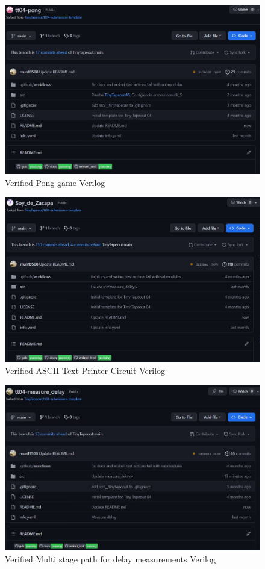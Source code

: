 \begin{figure}[H]
    \centering
    \includegraphics[width=\linewidth]{Pictures/pong.png}
    \caption{Verified Pong game Verilog}\label{fig:pong_verified}
\end{figure}

\begin{figure}[H]
    \centering
    \includegraphics[width=\linewidth]{Pictures/verifide_zacapa.png}
    \caption{Verified ASCII Text Printer Circuit Verilog}\label{fig:ascii_verified}
\end{figure}

\begin{figure}[H]
    \centering
    \includegraphics[width=\linewidth]{Pictures/delay_ver.png}
    \caption{Verified Multi stage path for delay measurements Verilog}\label{fig:delay_verified}
\end{figure}

